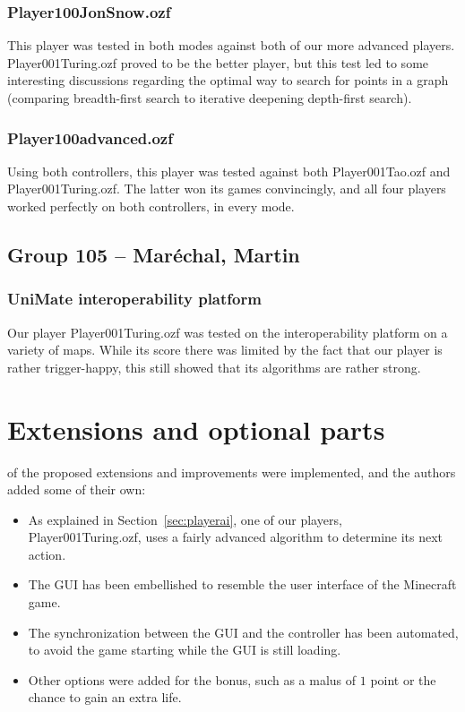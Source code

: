 \documentclass[12pt,journal]{IEEEtran}
\newcommand{\ntt}{\normalfont\ttfamily}
\newcommand{\fn}[1]{{\protect\ntt#1}}
\begin{document}
\subsubsection{Player100JonSnow.ozf}
This player was tested in both modes against both of our more advanced players.
\fn{Player001Turing.ozf} proved to be the better player, but this test led to some interesting discussions regarding the optimal way to search for points in a graph (comparing breadth-first search to iterative deepening depth-first search).

\subsubsection{\fn{Player100advanced.ozf}}
Using both controllers, this player was tested against both \fn{Player001Tao.ozf} and \fn{Player001Turing.ozf}.
The latter won its games convincingly, and all four players worked perfectly on both controllers, in every mode.

\subsection{Group 105 -- Maréchal, Martin}
\subsubsection{UniMate interoperability platform}
Our player \fn{Player001Turing.ozf} was tested on the interoperability platform on a variety of maps.
While its score there was limited by the fact that our player is rather trigger-happy, this still showed that its algorithms are rather strong.

\section{Extensions and optional parts}
\label{sec:extensions}
 of the proposed extensions and improvements were implemented, and the authors added some of their own:
\begin{itemize}
	\item As explained in Section~\ref{sec:playerai}, one of our players,
	\fn{Player001Turing.ozf}, uses a fairly advanced algorithm to determine its next action.
	\item The GUI has been embellished to resemble the user interface of the Minecraft game.
	\item The synchronization between the GUI and the controller has been automated, to avoid the game starting while the GUI is still loading.
	\item Other options were added for the bonus, such as a malus of \(1\) point or the chance to gain an extra life.
\end{itemize}
\end{document}
